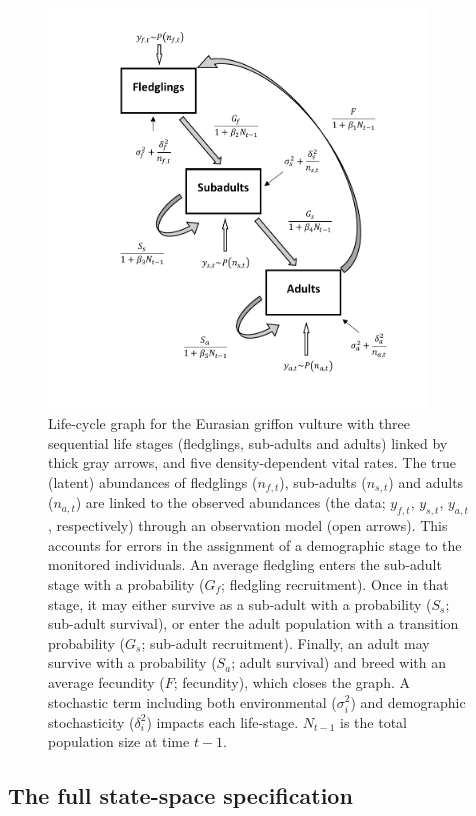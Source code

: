 \documentclass[12pt,a4paper]{article}
\begin{document}
\renewcommand{\thefigure}{S1}
\begin{figure}[htbp]
	\begin{center}
		\includegraphics[width=10cm]{figs/FigS1.pdf}
	\end{center}
	\caption{Life-cycle graph for the Eurasian griffon vulture with three sequential life stages (fledglings, sub-adults and adults) linked by thick gray arrows, and five density-dependent vital rates. The true (latent) abundances of fledglings ($n_{f,t}$), sub-adults ($n_{s,t}$) and adults ($n_{a,t}$) are linked to the observed abundances (the data; $y_{f,t}$, $y_{s,t}$, $y_{a,t}$, respectively) through an observation model (open arrows). This accounts for errors in the assignment of a demographic stage to the monitored individuals. An average fledgling enters the sub-adult stage with a probability ($G_{f}$; fledgling recruitment). Once in that stage, it may either survive as a sub-adult with a probability ($S_{s}$; sub-adult survival), or enter the adult population with a transition probability ($G_{s}$; sub-adult recruitment). Finally, an adult may survive with a probability ($S_{a}$; adult survival) and breed with an average fecundity ($F$; fecundity), which closes the graph. A stochastic term including both environmental ($\sigma_{i}^2$) and demographic stochasticity ($\delta_{i}^2$) impacts each life-stage. $ N_{t-1} $ is the total population size at time $t-1$.}
\label{fig:FigLifeCycle}
\end{figure}

\subsection{The full state-space specification}
\end{document}
